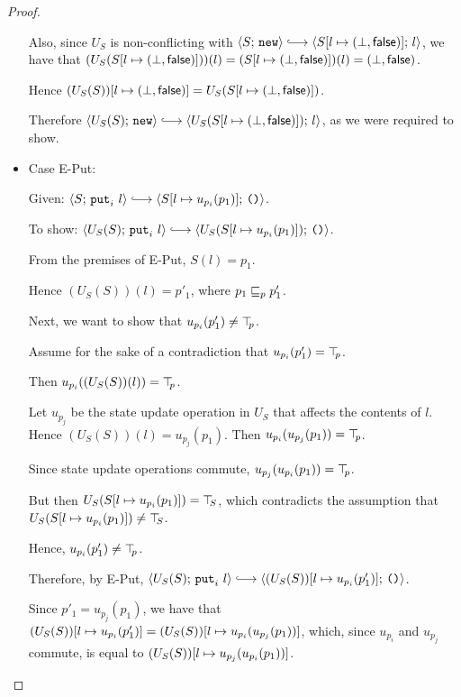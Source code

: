 \begin{proof}
\begin{itemize}
      Also, since $U_S$ is non-conflicting with $\config{S}{\NEW}
      \parstepsto \config{\extS{S}{l}{\bot}{\frozenfalse}}{l}$, we
      have that $(U_S(S[l \mapsto (\bot, \textsf{false})]))(l) =
      (S[l \mapsto (\bot, \textsf{false})])(l) =
      (\bot, \textsf{false})$.

      Hence $(U_S(S))[l \mapsto (\bot, \textsf{false})] =
      U_S(S[l \mapsto (\bot, \textsf{false})])$.

      Therefore $\config{U_S(S)}{\NEW} \parstepsto
      \config{U_S(\extS{S}{l}{\bot}{\frozenfalse})}{l}$, as we were
      required to show.

    \item Case {\sc E-Put}:

      Given: $\config{S}{\putiexp{l}} \parstepsto
      \config{\extSRaw{S}{l}{u_{p_i}(p_1)}}{\unit}$.

      To show: $\config{U_S(S)}{\putiexp{l}} \parstepsto
      \config{U_S(\extSRaw{S}{l}{u_{p_i}(p_1)})}{\unit}$.

      From the premises of {\sc E-Put}, $S(l) = p_1$.

      Hence $(U_S(S))(l) = p'_1$, where $p_1 \sqsubseteq_p p'_1$.

      Next, we want to show that $u_{p_i}(p'_1) \neq \top\hspace{-0.85mm}_{p}$.

      Assume for the sake of a contradiction that $u_{p_i}(p'_1) =
      \top\hspace{-0.85mm}_{p}$.

      Then $u_{p_i}((U_S(S))(l)) = \top\hspace{-0.85mm}_{p}$.

      Let $u_{p_j}$ be the state update operation in $U_S$ that
      affects the contents of $l$.  Hence $(U_S(S))(l) =
      u_{p_j}(p_1)$. Then $u_{p_i}(u_{p_j}(p_1)) = \top\hspace{-0.85mm}_{p}$.

      Since state update operations commute, $u_{p_j}(u_{p_i}(p_1)) =
      \top\hspace{-0.85mm}_{p}$.
      
      But then $U_S(S[l \mapsto u_{p_i}(p_1)]) = \top\hspace{-0.85mm}_{S}$,
      which contradicts the assumption that
      $U_S(S[l \mapsto u_{p_i}(p_1)]) \neq \top\hspace{-0.85mm}_{S}$.

      Hence, $u_{p_i}(p'_1) \neq \top\hspace{-0.85mm}_{p}$.

      Therefore, by {\sc E-Put}, $\config{U_S(S)}{\putiexp{l}}
      \parstepsto
      \config{\extSRaw{(U_S(S))}{l}{u_{p_i}(p'_1)}}{\unit}$.

      Since $p'_1 = u_{p_j}(p_1)$, we have that
      $(U_S(S))[l \mapsto u_{p_i}(p'_1)] =
      (U_S(S))[l \mapsto u_{p_i}(u_{p_j}(p_1))]$, which, since
      $u_{p_i}$ and $u_{p_j}$ commute, is equal to
      $(U_S(S))[l \mapsto u_{p_j}(u_{p_i}(p_1))]$.


\end{itemize}
\end{proof}
